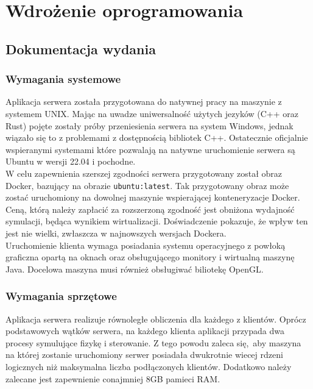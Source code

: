 \documentclass[15pt]{sprawozdanie}
\begin{document}
\newpage
\section{Wdrożenie oprogramowania}
\subsection{Dokumentacja wydania}
\subsubsection{Wymagania systemowe}
Aplikacja serwera została przygotowana do natywnej pracy na maszynie z systemem UNIX. Mając na uwadze uniwersalność użytych jezyków (C++ oraz Rust) pojęte zostały próby przeniesienia serwera na system Windows, jednak wiązało się to z problemami z dostępnością bibliotek C++. Ostatecznie oficjalnie wspieranymi systemami które pozwalają na natywne uruchomienie serwera są Ubuntu w wersji 22.04 i pochodne. \\

W celu zapewnienia szerszej zgodności serwera przygotowany został obraz Docker, bazujący na obrazie \texttt{ubuntu:latest}. Tak przygotowany obraz może zostać uruchomiony na dowolnej maszynie wspierającej konteneryzacje Docker. Ceną, którą należy zapłacić za rozszerzoną zgodność jest obniżona wydajność symulacji, będąca wynikiem wirtualizacji. Doświadczenie pokazuje, że wpływ ten jest nie wielki, zwłaszcza w najnowszych wersjach Dockera.\\

 Uruchomienie klienta wymaga posiadania systemu operacyjnego z powłoką graficzna opartą na oknach oraz obsługującego monitory i wirtualną maszynę Java. Docelowa maszyna musi również obsługiwać biliotekę OpenGL.


\subsubsection{Wymagania sprzętowe}

Aplikacja serwera realizuje równoległe obliczenia dla każdego z klientów. Oprócz podstawowych wątków serwera, na każdego klienta aplikacji przypada dwa procesy symulujące fizykę i sterowanie. Z tego powodu zaleca się, aby maszyna na której zostanie uruchomiony serwer posiadała dwukrotnie wiecej rdzeni logicznych niż maksymalna liczba podłączonych klientów. Dodatkowo należy zalecane jest zapewnienie conajmniej 8GB pamieci RAM. \\
\end{document}
